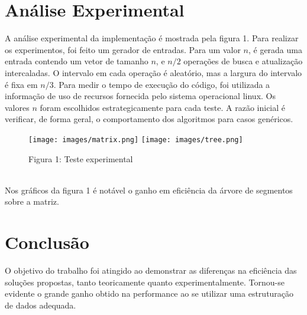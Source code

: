 \documentclass{article}
\begin{document}
\section{Análise Experimental}
A análise experimental da implementação é mostrada pela figura 1. Para realizar os experimentos, foi feito um gerador de entradas. Para um valor $n$, é gerada uma entrada contendo um vetor de tamanho $n$, e $n / 2$ operações de busca e atualização intercaladas. O intervalo em cada operação é aleatório, mas a largura do intervalo é fixa em $n / 3$. Para medir o tempo de execução do código, foi utilizada a informação de uso de recursos fornecida pelo sistema operacional linux. Os valores $n$ foram escolhidos estrategicamente para cada teste. A razão inicial é verificar, de forma geral, o comportamento dos algoritmos para casos genéricos.
\vspace{-10pt}
\begin{figure}[h]
  \centering
  \texttt{[image: images/matrix.png]}
  \texttt{[image: images/tree.png]}
  \caption{Figura 1: Teste experimental}
\end{figure}\\
Nos gráficos da figura 1 é notável o ganho em eficiência da árvore de segmentos sobre a matriz.

\section{Conclusão}
O objetivo do trabalho foi atingido ao demonstrar as diferenças na eficiência das soluções propostas, tanto teoricamente quanto experimentalmente. Tornou-se evidente o grande ganho obtido na performance ao se utilizar uma estruturação de dados adequada.
\end{document}
